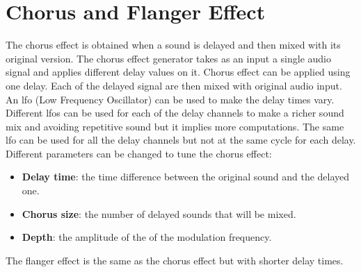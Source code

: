 \section{Chorus and Flanger Effect}

The chorus effect is obtained when a sound is delayed and then mixed with its original version. 
The chorus effect generator takes as an input a single audio signal and applies different delay values on it. Chorus effect can be applied using one delay. Each of the delayed signal are then mixed with original audio input. 
An \gls{lfo} (Low Frequency Oscillator) can be used to make the delay times vary. Different \gls{lfo}s can be used for each of the delay channels to make a richer sound mix and avoiding repetitive sound but it implies more computations. The same \gls{lfo} can be used for all the delay channels but not at the same cycle for each delay. \\

Different parameters can be changed to tune the chorus effect:\\
\begin{itemize}
\item \textbf{Delay time}: the time difference between the original sound and the delayed one.
\item \textbf{Chorus size}: the number of delayed sounds that will be mixed.
\item \textbf{Depth}: the amplitude of the of the modulation frequency.
\end{itemize}

The flanger effect is the same as the chorus effect but with shorter delay times. 

